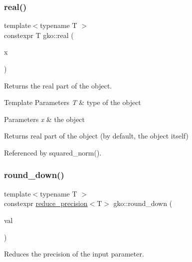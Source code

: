 \subsubsection{\texorpdfstring{real()}{real()}}
{\footnotesize\ttfamily template$<$typename T $>$ \\
constexpr T gko\+::real (\begin{DoxyParamCaption}\item[{const T \&}]{x }\end{DoxyParamCaption})\hspace{0.3cm}{\ttfamily [inline]}}



Returns the real part of the object. 


\begin{DoxyTemplParams}{Template Parameters}
{\em T} & type of the object\\
\hline
\end{DoxyTemplParams}

\begin{DoxyParams}{Parameters}
{\em x} & the object\\
\hline
\end{DoxyParams}
\begin{DoxyReturn}{Returns}
real part of the object (by default, the object itself) 
\end{DoxyReturn}


Referenced by squared\+\_\+norm().

\mbox{\label{namespacegko_a5f9c197f1db98fdc874f8907978ad114}} 
\subsubsection{\texorpdfstring{round\+\_\+down()}{round\_down()}}
{\footnotesize\ttfamily template$<$typename T $>$ \\
constexpr \hyperlink{namespacegko_ab5d71c1f4bd1b654df1e561ea7a811f2}{reduce\+\_\+precision}$<$T$>$ gko\+::round\+\_\+down (\begin{DoxyParamCaption}\item[{T}]{val }\end{DoxyParamCaption})\hspace{0.3cm}{\ttfamily [inline]}}



Reduces the precision of the input parameter. 


